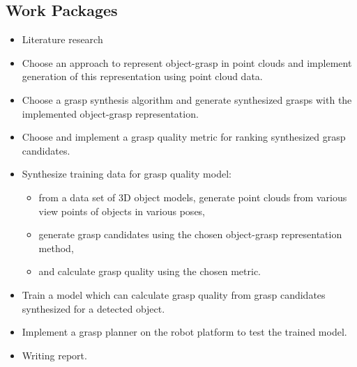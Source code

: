 \documentclass[12pt]{article}
\begin{document}
    \subsection{Work Packages}
    \begin{itemize}
    	\item Literature research
    	\item Choose an approach to represent object-grasp in point clouds and implement generation of this representation using point cloud data.
    	\item Choose a grasp synthesis algorithm and generate synthesized grasps with the implemented object-grasp representation.
    	\item Choose and implement a grasp quality metric for ranking synthesized grasp candidates.
    	\item Synthesize training data for grasp quality model:
    	\begin{itemize}
    		\item from a data set of 3D object models, generate point clouds from various view points of objects in various poses,
    		\item generate grasp candidates using the chosen object-grasp representation method,
    		\item and calculate grasp quality using the chosen metric.
    	\end{itemize}
    	\item Train a model which can calculate grasp quality from grasp candidates synthesized for a detected object.
    	\item Implement a grasp planner on the robot platform to test the trained model.
    	\item Writing report.
    \end{itemize}

\end{document}
